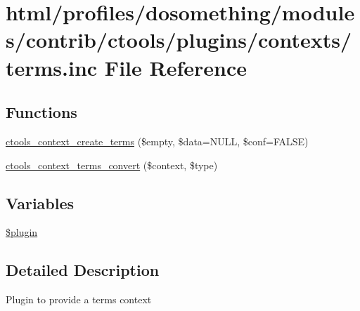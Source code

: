 \hypertarget{contexts_2terms_8inc}{
\section{html/profiles/dosomething/modules/contrib/ctools/plugins/contexts/terms.inc File Reference}
\label{contexts_2terms_8inc}
}
\subsection*{Functions}
\begin{DoxyCompactItemize}
\item 
\hyperlink{contexts_2terms_8inc_a0a71790a760636b43936682e9f310ae2}{ctools\_\-context\_\-create\_\-terms} (\$empty, \$data=NULL, \$conf=FALSE)
\item 
\hyperlink{contexts_2terms_8inc_aa556c779179faa1c50963ec53ffc7320}{ctools\_\-context\_\-terms\_\-convert} (\$context, \$type)
\end{DoxyCompactItemize}
\subsection*{Variables}
\begin{DoxyCompactItemize}
\item 
\hyperlink{contexts_2terms_8inc_ada8a7130088351710bb02ed622d6bf65}{\$plugin}
\end{DoxyCompactItemize}


\subsection{Detailed Description}
Plugin to provide a terms context 


